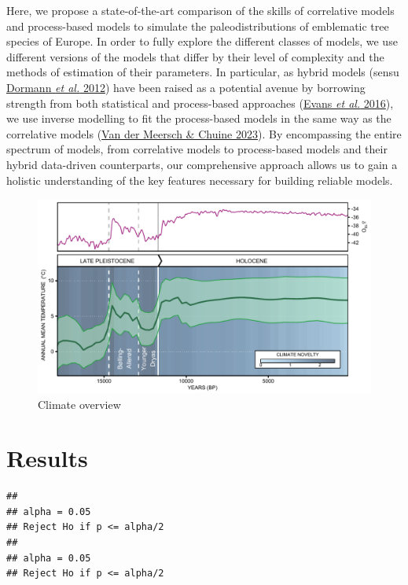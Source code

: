 \documentclass[11pt,]{article}
\begin{document}
Here, we propose a state-of-the-art comparison of the skills of
correlative models and process-based models to simulate the
paleodistributions of emblematic tree species of Europe. In order to
fully explore the different classes of models, we use different versions
of the models that differ by their level of complexity and the methods
of estimation of their parameters. In particular, as hybrid models
(sensu \protect\hyperlink{ref-Dormann2012}{Dormann \emph{et al.} 2012})
have been raised as a potential avenue by borrowing strength from both
statistical and process-based approaches
(\protect\hyperlink{ref-Evans2016}{Evans \emph{et al.} 2016}), we use
inverse modelling to fit the process-based models in the same way as the
correlative models (\protect\hyperlink{ref-VanderMeersch2023}{Van der
Meersch \& Chuine 2023}). By encompassing the entire spectrum of models,
from correlative models to process-based models and their hybrid
data-driven counterparts, our comprehensive approach allows us to gain a
holistic understanding of the key features necessary for building
reliable models.

\begin{figure}
\centering
\includegraphics{paper_files/figure-latex/figure_climate_overview-1.pdf}
\caption{Climate overview}
\end{figure}

\hypertarget{results}{%
\section{Results}\label{results}}

\begin{verbatim}
## 
## alpha = 0.05
## Reject Ho if p <= alpha/2
## 
## alpha = 0.05
## Reject Ho if p <= alpha/2
\end{verbatim}
\end{document}
